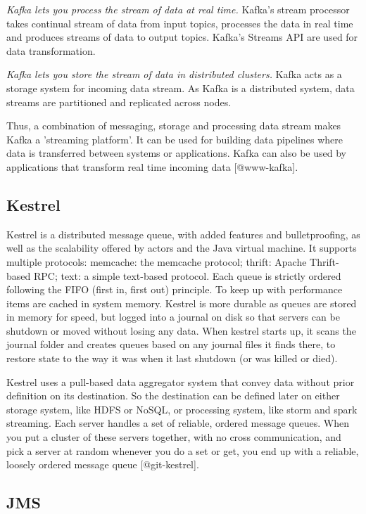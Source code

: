 \textit{Kafka lets you process the stream of data at real time.}
Kafka's stream processor takes continual stream of data from input
topics, processes the data in real time and produces streams of data
to output topics. Kafka's Streams API are used for data
transformation.

\textit{Kafka lets you store the stream of data in distributed
clusters.} Kafka acts as a storage system for incoming data stream. As
Kafka is a distributed system, data streams are partitioned and
replicated across nodes.

Thus, a combination of messaging, storage and processing data stream
makes Kafka a 'streaming platform'. It can be used for building data
pipelines where data is transferred between systems or
applications. Kafka can also be used by applications that transform
real time incoming data [@www-kafka].

\subsection{Kestrel}
     
Kestrel is a distributed message queue, with added features and
bulletproofing, as well as the scalability offered by actors and the
Java virtual machine. It supports multiple protocols: memcache: the
memcache protocol; thrift: Apache Thrift-based RPC; text: a simple
text-based protocol. Each queue is strictly ordered following the FIFO
(first in, first out) principle. To keep up with performance items are
cached in system memory. Kestrel is more durable as queues are stored
in memory for speed, but logged into a journal on disk so that servers
can be shutdown or moved without losing any data. When kestrel starts
up, it scans the journal folder and creates queues based on any
journal files it finds there, to restore state to the way it was when
it last shutdown (or was killed or died).

Kestrel uses a pull-based data aggregator system that convey data
without prior definition on its destination. So the destination can be
defined later on either storage system, like HDFS or NoSQL, or
processing system, like storm and spark streaming. Each server handles
a set of reliable, ordered message queues. When you put a cluster of
these servers together, with no cross communication, and pick a server
at random whenever you do a set or get, you end up with a reliable,
loosely ordered message queue [@git-kestrel].

\subsection{JMS}

